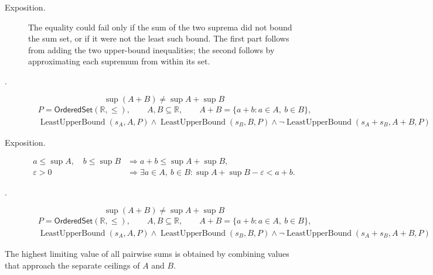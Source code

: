\begin{remark*}
\begin{description}
  \item[Exposition.]
The equality could fail only if the sum of the two suprema did not bound the sum set, or if it were not the least such bound. The first part follows from adding the two upper-bound inequalities; the second follows by approximating each supremum from within its set.


  \item[.]
  \[
\sup(A+B)\ne \sup A+\sup B
\]
\[
\begin{aligned}
&P=\mathsf{OrderedSet}(\mathbb{R},\leq),\qquad A,B\subseteq\mathbb{R},\qquad A+B=\{a+b:a\in A,\ b\in B\},\\
&\operatorname{LeastUpperBound}(s_A,A,P)\land \operatorname{LeastUpperBound}(s_B,B,P)
\land
\neg\operatorname{LeastUpperBound}(s_A+s_B,A+B,P)
\end{aligned}
\]
\end{description}
\end{remark*}

\begin{remark*}
\begin{description}
  \item[Exposition.]
\[
\begin{aligned}
a\le \sup A,\quad b\le \sup B
&\Longrightarrow a+b\le \sup A+\sup B,\\
\varepsilon>0
&\Longrightarrow
\exists a\in A,\ b\in B:
\sup A+\sup B-\varepsilon<a+b.
\end{aligned}
\]


  \item[.]
  \[
\sup(A+B)\ne \sup A+\sup B
\]
\[
\begin{aligned}
&P=\mathsf{OrderedSet}(\mathbb{R},\leq),\qquad A,B\subseteq\mathbb{R},\qquad A+B=\{a+b:a\in A,\ b\in B\},\\
&\operatorname{LeastUpperBound}(s_A,A,P)\land \operatorname{LeastUpperBound}(s_B,B,P)
\land
\neg\operatorname{LeastUpperBound}(s_A+s_B,A+B,P)
\end{aligned}
\]
\end{description}
\end{remark*}

\begin{remark*}[Interpretation]
The highest limiting value of all pairwise sums is obtained by combining values that approach the separate ceilings of $A$ and $B$.
\end{remark*}

